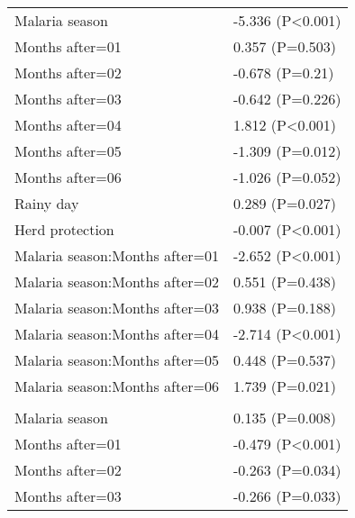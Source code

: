 \documentclass[]{article}
\begin{document}
\begin{longtable}[t]{ll}
\hspace{1em}Malaria season & -5.336 (P<0.001)\\
\hspace{1em}Months after=01 & 0.357 (P=0.503)\\
\hspace{1em}Months after=02 & -0.678 (P=0.21)\\
\hspace{1em}Months after=03 & -0.642 (P=0.226)\\
\hspace{1em}Months after=04 & 1.812 (P<0.001)\\
\hspace{1em}Months after=05 & -1.309 (P=0.012)\\
\hspace{1em}Months after=06 & -1.026 (P=0.052)\\
\hspace{1em}Rainy day & 0.289 (P=0.027)\\
\hspace{1em}Herd protection & -0.007 (P<0.001)\\
\hspace{1em}Malaria season:Months after=01 & -2.652 (P<0.001)\\
\hspace{1em}Malaria season:Months after=02 & 0.551 (P=0.438)\\
\hspace{1em}Malaria season:Months after=03 & 0.938 (P=0.188)\\
\hspace{1em}Malaria season:Months after=04 & -2.714 (P<0.001)\\
\hspace{1em}Malaria season:Months after=05 & 0.448 (P=0.537)\\
\hspace{1em}Malaria season:Months after=06 & 1.739 (P=0.021)\\
\addlinespace[1.5em]
\multicolumn{2}{l}{\textbf{Temporary field worker}}\\
\hspace{1em}Malaria season & 0.135 (P=0.008)\\
\hspace{1em}Months after=01 & -0.479 (P<0.001)\\
\hspace{1em}Months after=02 & -0.263 (P=0.034)\\
\hspace{1em}Months after=03 & -0.266 (P=0.033)\\

\end{longtable}
\end{document}
